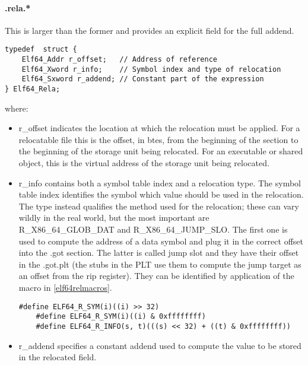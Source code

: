 \documentclass[paper=a4, fontsize=11pt]{report} %
\numberwithin{equation}{section} %
\numberwithin{figure}{section} %
\numberwithin{table}{section} %
\begin{document}
\paragraph{.rela.*}
This is larger than the former and provides an explicit field for the full 
addend.
\begin{lstlisting}[style=ansic, caption={.rel.* entries}, label=rel]
typedef  struct {
	Elf64_Addr r_offset;   // Address of reference
	Elf64_Xword r_info;    // Symbol index and type of relocation
	Elf64_Sxword r_addend; // Constant part of the expression
} Elf64_Rela;
\end{lstlisting}
where:
\begin{itemize}
	\item {\ttfamily r\_offset} indicates the location at which the relocation 
	must be applied. For a relocatable file this is the offset, in btes, from 
	the beginning of the section to the beginning of the storage unit being 
	relocated. For an executable or shared object, this is the virtual address 
	of the storage unit being relocated.
	\item {\ttfamily r\_info} contains both a symbol table index and a 
	relocation type. The symbol table index identifies the symbol which value 
	should be used in the relocation.
	The type instead qualifies the method used for the relocation; these can 
	vary wildly in the real world, but the most important are {\ttfamily 
	R\_X86\_64\_GLOB\_DAT} and {\ttfamily R\_X86\_64\_JUMP\_SLO}. 
	\subitem The first one is used to compute the address of a data symbol and 
	plug it in the correct offset into the {\ttfamily .got} section.
	\subitem The latter is called jump slot and they have their offset in the 
	{\ttfamily .got.plt} (the stubs in the PLT use them to compute the jump 
	target as an offset from the {\ttfamily rip} register).
	They can be identified by application of the macro in \ref{elf64relmacros}.
	\begin{lstlisting}[style=ansic,caption={Macros},label=elf64relmacros]
	#define ELF64_R_SYM(i)((i) >> 32)
	#define ELF64_R_SYM(i)((i) & 0xffffffff)
	#define ELF64_R_INFO(s, t)(((s) << 32) + ((t) & 0xffffffff))
	\end{lstlisting}
	\item {\ttfamily r\_addend} specifies a constant addend used to compute the 
	value to be stored in the relocated field.
\end{itemize}
\pagebreak
\end{document}
